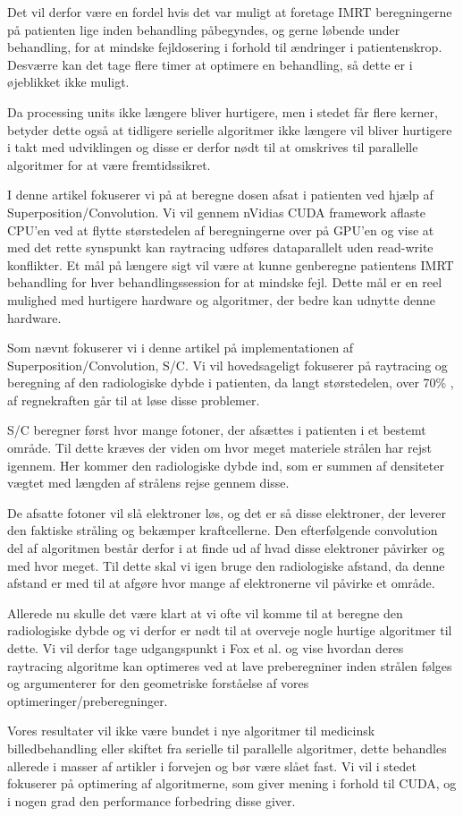 Det vil derfor være en fordel hvis det var muligt at foretage IMRT
beregningerne på patienten lige inden behandling påbegyndes, og gerne
løbende under behandling, for at mindske fejldosering i forhold til
ændringer i patientenskrop. Desværre kan det tage flere timer at
optimere en behandling, så dette er i øjeblikket ikke muligt.

Da processing units ikke længere bliver hurtigere, men i stedet får
flere kerner, betyder dette også at tidligere serielle algoritmer ikke
længere vil bliver hurtigere i takt med udviklingen og disse er derfor
nødt til at omskrives til parallelle algoritmer for at være
fremtidssikret.

I denne artikel fokuserer vi på at beregne dosen afsat i patienten ved
hjælp af Superposition/Convolution\cite{sc}. Vi vil gennem nVidias
CUDA framework aflaste CPU'en ved at flytte størstedelen af
beregningerne over på GPU'en og vise at med det rette synspunkt kan
raytracing udføres dataparallelt uden read-write konflikter. Et mål på
længere sigt vil være at kunne genberegne patientens IMRT behandling
for hver behandlingssession for at mindske fejl. Dette mål er en reel
mulighed med hurtigere hardware og algoritmer, der bedre kan udnytte
denne hardware.

Som nævnt fokuserer vi i denne artikel på implementationen af
Superposition/Convolution, S/C. Vi vil hovedsageligt fokuserer på
raytracing og beregning af den radiologiske dybde i patienten, da
langt størstedelen, over 70\% \cite{fastraytracing}, af regnekraften
går til at løse disse problemer.

S/C beregner først hvor mange fotoner, der afsættes i patienten i et
bestemt område. Til dette kræves der viden om hvor meget materiele
strålen har rejst igennem. Her kommer den radiologiske dybde ind, som
er summen af densiteter vægtet med længden af strålens rejse gennem
disse.

De afsatte fotoner vil slå elektroner løs, og det er så disse
elektroner, der leverer den faktiske stråling og bekæmper
kraftcellerne. Den efterfølgende convolution del af algoritmen består
derfor i at finde ud af hvad disse elektroner påvirker og med hvor
meget. Til dette skal vi igen bruge den radiologiske afstand, da denne
afstand er med til at afgøre hvor mange af elektronerne vil påvirke et
område.

Allerede nu skulle det være klart at vi ofte vil komme til at beregne
den radiologiske dybde og vi derfor er nødt til at overveje nogle
hurtige algoritmer til dette. Vi vil derfor tage udgangspunkt i Fox et
al. \cite{fastraytracing} og vise hvordan deres raytracing algoritme
kan optimeres ved at lave preberegniner inden strålen følges og
argumenterer for den geometriske forståelse af vores
optimeringer/preberegninger.

Vores resultater vil ikke være bundet i nye algoritmer til medicinsk
billedbehandling eller skiftet fra serielle til parallelle algoritmer,
dette behandles allerede i masser af artikler i forvejen og bør være
slået fast. Vi vil i stedet fokuserer på optimering af algoritmerne,
som giver mening i forhold til CUDA, og i nogen grad den performance
forbedring disse giver.
